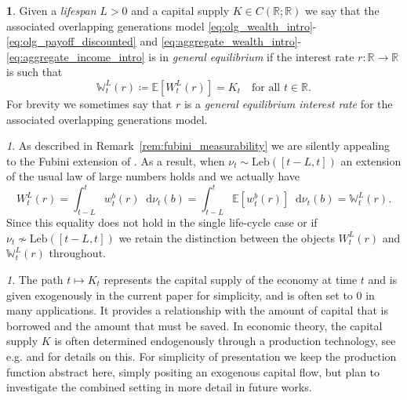 \documentclass[11pt,oneside,english,reqno,dvipsnames,table]{amsart}
\numberwithin{equation}{section}
\theoremstyle{plain}
\theoremstyle{definition}
\newtheorem{defn}[thm]{\protect\definitionname}
\theoremstyle{remark}
\newtheorem{rem}[thm]{\protect\remarkname}
\theoremstyle{plain}
\theoremstyle{plain}
\theoremstyle{plain}
\theoremstyle{plain}
\theoremstyle{plain}
\theoremstyle{plain}
\theoremstyle{plain}
\providecommand{\definitionname}{Definition}
\providecommand{\remarkname}{Remark}
\providecommand{\remarkname}{Remark}
\newcommand{\RR}{\mathbb{R}}
\newcommand{\dd}{\mathop{}\!\mathrm{d}}
\newcommand{\mbE}{\mathbb{E}}
\newcommand{\mbR}{\mathbb{R}}
\newcommand{\mbW}{\mathbb{W}}
\numberwithin{thm}{section}
\begin{document}
%
\begin{defn}\label{def:intro_olg_clearing_rate}
    Given a \emph{lifespan} $L>0$ and a capital supply $K\in C(\RR;\RR)$  we say that the associated overlapping generations model \eqref{eq:olg_wealth_intro}-\eqref{eq:olg_payoff_discounted} and \eqref{eq:aggregate_wealth_intro}-\eqref{eq:aggregate_income_intro} is in \emph{general equilibrium} if the interest rate $r:\mbR\to \mbR$ is such that
    \begin{equation}\label{eq:olg_clearing_intro}
        \mbW^L_t(r) \coloneqq \mbE\left[W^L_t(r)\right] = K_t \quad \text{for all}\,\, t\in \mbR.
        \end{equation}
        For brevity we sometimes say that $r$ is a \emph{general equilibrium interest rate} for the associated overlapping generations model.
\end{defn}

\begin{rem}\label{rem:fubini_lln}
 As described in Remark~\ref{rem:fubini_measurability} we are silently appealing to the Fubini extension of \cite{sun_06_exact}. As a result, when $\nu_t \sim \text{Leb}([t-L,t])$ an extension of the usual law of large numbers holds and we actually have
    \begin{equation}
        W^L_t(r) = \int_{t-L}^t w^b_t(r) \dd \nu_t(b) = \int_{t-L}^t \mbE[w^b_t(r)] \dd \nu_t(b) = \mbW^L_t(r).
    \end{equation}
    Since this equality does not hold in the single life-cycle case or if $\nu_t \not \sim \text{Leb}([t-L,t])$ we retain the distinction between the objects $W^L_t(r)$ and $\mbW^L_t(r)$ throughout.
\end{rem}

\begin{rem}
%
The path $t\mapsto K_t$ represents the capital supply of the economy at time $t$ and is given exogenously in the current paper for simplicity, and is often set to $0$ in many applications. It provides a relationship with the amount of capital that is borrowed and the amount that must be saved. In economic theory, the capital supply $K$ is often determined endogenously through a production technology, see e.g. \cite{aiyagari_94_uninsured} and \cite{krusell_smith_98_income} for details on this. For simplicity of presentation we keep the production function abstract here, simply positing an exogenous capital flow, but plan to investigate the combined setting in more detail in future works.  
%
\end{rem}
\end{document}
